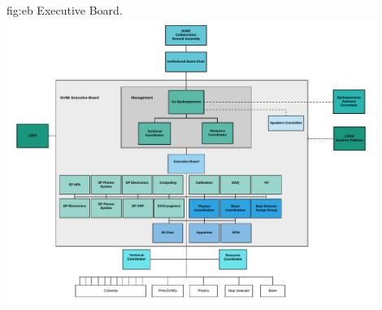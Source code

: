 \begin{dunefigure}	
{fig:eb}{ Executive Board.}
\includegraphics[width=0.9\textwidth]{graphics/eb.pdf}
\end{dunefigure}

